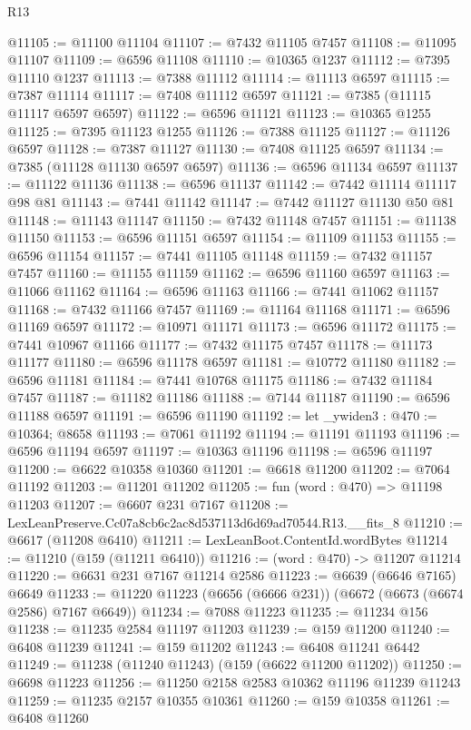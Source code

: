 \begin{lexlean}{R13}
\begin{coremodule}
@11105 := @11100 @11104
@11107 := @7432 @11105 @7457
@11108 := @11095 @11107
@11109 := @6596 @11108
@11110 := @10365 @1237
@11112 := @7395 @11110 @1237
@11113 := @7388 @11112
@11114 := @11113 @6597
@11115 := @7387 @11114
@11117 := @7408 @11112 @6597
@11121 := @7385 (@11115 @11117 @6597 @6597)
@11122 := @6596 @11121
@11123 := @10365 @1255
@11125 := @7395 @11123 @1255
@11126 := @7388 @11125
@11127 := @11126 @6597
@11128 := @7387 @11127
@11130 := @7408 @11125 @6597
@11134 := @7385 (@11128 @11130 @6597 @6597)
@11136 := @6596 @11134 @6597
@11137 := @11122 @11136
@11138 := @6596 @11137
@11142 := @7442 @11114 @11117 @98 @81
@11143 := @7441 @11142
@11147 := @7442 @11127 @11130 @50 @81
@11148 := @11143 @11147
@11150 := @7432 @11148 @7457
@11151 := @11138 @11150
@11153 := @6596 @11151 @6597
@11154 := @11109 @11153
@11155 := @6596 @11154
@11157 := @7441 @11105 @11148
@11159 := @7432 @11157 @7457
@11160 := @11155 @11159
@11162 := @6596 @11160 @6597
@11163 := @11066 @11162
@11164 := @6596 @11163
@11166 := @7441 @11062 @11157
@11168 := @7432 @11166 @7457
@11169 := @11164 @11168
@11171 := @6596 @11169 @6597
@11172 := @10971 @11171
@11173 := @6596 @11172
@11175 := @7441 @10967 @11166
@11177 := @7432 @11175 @7457
@11178 := @11173 @11177
@11180 := @6596 @11178 @6597
@11181 := @10772 @11180
@11182 := @6596 @11181
@11184 := @7441 @10768 @11175
@11186 := @7432 @11184 @7457
@11187 := @11182 @11186
@11188 := @7144 @11187
@11190 := @6596 @11188 @6597
@11191 := @6596 @11190
@11192 := let _ywiden3 : @470 := @10364; @8658
@11193 := @7061 @11192
@11194 := @11191 @11193
@11196 := @6596 @11194 @6597
@11197 := @10363 @11196
@11198 := @6596 @11197
@11200 := @6622 @10358 @10360
@11201 := @6618 @11200
@11202 := @7064 @11192
@11203 := @11201 @11202
@11205 := fun (word : @470) => @11198 @11203
@11207 := @6607 @231 @7167
@11208 := LexLeanPreserve.Cc07a8cb6c2ac8d537113d6d69ad70544.R13.__fits_8
@11210 := @6617 (@11208 @6410)
@11211 := LexLeanBoot.ContentId.wordBytes
@11214 := @11210 (@159 (@11211 @6410))
@11216 := (word : @470) -> @11207 @11214
@11220 := @6631 @231 @7167 @11214 @2586
@11223 := @6639 (@6646 @7165) @6649
@11233 := @11220 @11223 (@6656 (@6666 @231)) (@6672 (@6673 (@6674 @2586) @7167 @6649))
@11234 := @7088 @11223
@11235 := @11234 @156
@11238 := @11235 @2584 @11197 @11203
@11239 := @159 @11200
@11240 := @6408 @11239
@11241 := @159 @11202
@11243 := @6408 @11241 @6442
@11249 := @11238 (@11240 @11243) (@159 (@6622 @11200 @11202))
@11250 := @6698 @11223
@11256 := @11250 @2158 @2583 @10362 @11196 @11239 @11243
@11259 := @11235 @2157 @10355 @10361
@11260 := @159 @10358
@11261 := @6408 @11260

\end{coremodule}
\end{lexlean}
